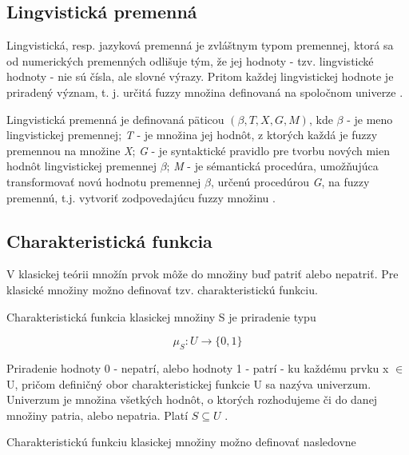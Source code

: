 \subsection*{Lingvistická premenná}
Lingvistická, resp. jazyková premenná je zvláštnym typom premennej, ktorá sa od numerických premenných odlišuje tým, že jej hodnoty - tzv. lingvistické hodnoty - nie sú čísla, ale slovné výrazy. Pritom každej lingvistickej hodnote je priradený význam, t. j. určitá fuzzy množina definovaná na spoločnom univerze \cite{gregorUI}.
\begin{defn} 
	Lingvistická premenná je definovaná päticou \textit{$\left(\beta, T, X, G, M \right) $}, kde 
	$\beta$ - je meno lingvistickej premennej; 
	\textit{T} - je množina jej hodnôt, z ktorých každá je fuzzy premennou na množine \textit{X};
	\textit{G} - je syntaktické pravidlo pre tvorbu nových mien hodnôt lingvistickej premennej $\beta$;
	\textit{M} - je sémantická procedúra, umožňujúca transformovať novú hodnotu premennej $\beta$, určenú procedúrou\textit{ G}, na fuzzy premennú, t.j. vytvoriť zodpovedajúcu fuzzy množinu \cite{levashenkoProj, Kaufman1985, Klir1995, Navara2011}. \end{defn}

\subsection*{Charakteristická funkcia}
V klasickej teórii množín prvok môže do množiny buď patriť alebo nepatriť. Pre klasické množiny možno definovať tzv. charakteristickú funkciu. 
\begin{defn} 
Charakteristická funkcia klasickej množiny S je priradenie typu \cite{gregorUI} 

\begin{equation}\label{charfunkcia}
\mu_S : U \longrightarrow \{0, 1\}
\end{equation}

Priradenie hodnoty 0 - nepatrí, alebo hodnoty 1 - patrí - ku každému prvku x $\in$ U, pričom definičný obor charakteristickej funkcie U sa nazýva univerzum. Univerzum je množina všetkých hodnôt, o ktorých rozhodujeme či do danej množiny patria, alebo nepatria. Platí $S \subseteq U$ \cite{gregorUI}. \end{defn}

Charakteristickú funkciu klasickej množiny možno definovať nasledovne \cite{gregorUI, gregorRef14} 


